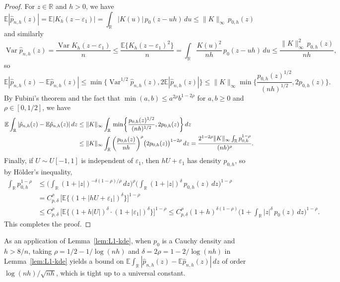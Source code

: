 \documentclass[a4paper]{article}
\newcommand{\R}{\mathbb{R}}
\newcommand{\E}{\mathbb{E}}
\newcommand{\norm}[1]{\|{#1}\|}
\DeclareMathOperator\Var{Var}
\theoremstyle{definition}
\begin{document}
\begin{proof}
For $z \in \R$ and $h > 0$, we have
\[
\E|\hat{p}_{n,h}(z)| = \E |K_h(z - \varepsilon_1)| = \int_\R |K(u)|\,p_0(z - uh)\,du \leq \norm{K}_\infty\,p_{0,h}(z)
\]
and similarly
\[
\Var\hat{p}_{n,h}(z) = \frac{\Var K_h(z - \varepsilon_1)}{n} \leq \frac{\E\{K_h(z - \varepsilon_1)^2\}}{n} = \int_\R \frac{K(u)^2}{nh}\,p_0(z - uh)\,du \leq \frac{\norm{K}_\infty^2\,p_{0,h}(z)}{nh},
\]
so
\[
\E|\hat{p}_{n,h}(z) - \E\hat{p}_{n,h}(z)| \leq \min\bigl\{\Var^{1/2}\hat{p}_{n,h}(z), 2\E|\hat{p}_{n,h}(z)|\bigr\} \leq \norm{K}_\infty \min\biggl\{\frac{p_{0,h}(z)^{1/2}}{(nh)^{1/2}}, 2p_{0,h}(z)\biggr\}.
\]
By Fubini's theorem and the fact that $\min(a,b) \leq a^{2\rho}b^{1 - 2\rho}$ for $a,b \geq 0$ and $\rho \in [0,1/2]$, we have
\begin{align*}
\E\int_\R |\hat{p}_{n,h}(z) - \E\hat{p}_{n,h}(z)|\,dz &\leq \norm{K}_\infty \int_\R\,\min\biggl\{\frac{p_{0,h}(z)^{1/2}}{(nh)^{1/2}}, 2p_{0,h}(z)\biggr\}\,dz \notag \\
&\leq \norm{K}_\infty \int_\R\,\biggl(\frac{p_{0,h}(z)}{nh}\biggr)^\rho \bigl(2p_{0,h}(z)\bigr)^{1 - 2\rho}\,dz
= \frac{2^{1 - 2\rho} \norm{K}_\infty \int_\R p_{0,h}^{1 - \rho}}{(nh)^\rho}.
\end{align*}
Finally, if $U \sim U[-1,1]$ is independent of $\varepsilon_1$, then $hU + \varepsilon_1$ has density $p_{0,h}$, so by H\"older's inequality,
\begin{align*}
\int_\R p_{0,h}^{1 - \rho} &\leq \biggl(\int_\R (1 + |z|)^{-\delta(1 - \rho)/\rho}\,dz\biggr)^\rho \biggl(\int_\R (1 + |z|)^\delta\,p_{0,h}(z)\,dz\biggr)^{1 - \rho} \\
&= C_{p,\delta}^\rho\,\bigl[\E\bigl\{(1 + |hU + \varepsilon_1|)^\delta\bigr\}\bigr]^{1 - \rho} \\
&\leq C_{p,\delta}^\rho\,\bigl[\E\bigl\{(1 + h|U|)^\delta \cdot (1 + |\varepsilon_1|)^\delta\bigr\}\bigr]^{1 - \rho} \leq C_{p,\delta}^\rho(1 + h)^{\delta(1 - \rho)} \biggl(1 + \int_\R |z|^\delta\,p_0(z)\,dz\biggr)^{1 - \rho}.
\end{align*}
This completes the proof.
\end{proof}

As an application of  Lemma~\ref{lem:L1-kde}, when $p_0$ is a Cauchy density and $h > 8/n$, taking $\rho = 1/2 - 1/\log(nh)$ and $\delta = 2\rho = 1 - 2/\log(nh)$ in Lemma~\ref{lem:L1-kde} yields a bound on $\E\int_\R |\hat{p}_{n,h}(z) - \E\hat{p}_{n,h}(z)|\,dz$ of order $\log(nh)/\sqrt{nh}$, which is tight up to a universal constant.
\end{document}
